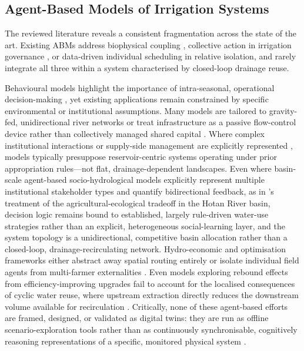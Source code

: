 \documentclass{article}
\begin{document}
\subsection{Agent-Based Models of Irrigation Systems}
\begin{changed}
The reviewed literature reveals a consistent fragmentation across the state of the art. Existing ABMs address biophysical coupling \cite{ElFartassi2025, Ghoreishi2021, Hyun2019, Sola2024, Streefkerk2023}, collective action in irrigation governance \cite{Cao2017, OkuraBudiasaKato2022}, or data-driven individual scheduling \cite{Agyeman2024, Chen2021RL} in relative isolation, and rarely integrate all three within a system characterised by closed-loop drainage reuse.
\end{changed}
Behavioural models highlight the importance of intra-seasonal, operational decision-making \cite{Alam2022, Wens2021}, yet existing applications remain constrained by specific environmental or institutional assumptions. Many models are tailored to gravity-fed, unidirectional river networks \cite{AIRABM2023, Sola2024, Vanelli2024, Wang2024Hotan} or treat infrastructure as a passive flow-control device rather than collectively managed shared capital \cite{VanderWal2022}. Where complex institutional interactions or supply-side management are explicitly represented \cite{Bahrami2022, Hyun2019}, models typically presuppose reservoir-centric systems operating under prior appropriation rules---not flat, drainage-dependent landscapes. Even where basin-scale agent-based socio-hydrological models explicitly represent multiple institutional stakeholder types and quantify bidirectional feedback, as in \cite{Wang2024Hotan}'s treatment of the agricultural-ecological tradeoff in the Hotan River basin, decision logic remains bound to established, largely rule-driven water-use strategies rather than an explicit, heterogeneous social-learning layer, and the system topology is a unidirectional, competitive basin allocation rather than a closed-loop, drainage-recirculating network. Hydro-economic and optimisation frameworks either abstract away spatial routing entirely \cite{Aghaie2020, Pouladi2019} or isolate individual field agents from multi-farmer externalities \cite{Agyeman2024, Chen2021RL}. Even models exploring rebound effects from efficiency-improving upgrades fail to account for the localised consequences of cyclic water reuse, where upstream extraction directly reduces the downstream volume available for recirculation \cite{Ghoreishi2021, Tamburino2020}. Critically, none of these agent-based efforts are framed, designed, or validated as digital twins: they are run as offline scenario-exploration tools rather than as continuously synchronisable, cognitively reasoning representations of a specific, monitored physical system \cite{Kritzinger2018DigitalTwin, Tao2019DigitalTwin}.
\end{document}
